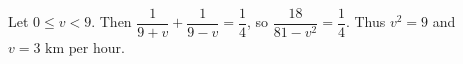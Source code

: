 Let $0\le v<9$. Then $\dfrac{1}{9+v}+\dfrac{1}{9-v}=\dfrac{1}{4}$, so $\dfrac{18}{81-v^2}=\dfrac{1}{4}$. Thus $v^2=9$ and $\boxed{v=3\text{ km per hour}}$.
